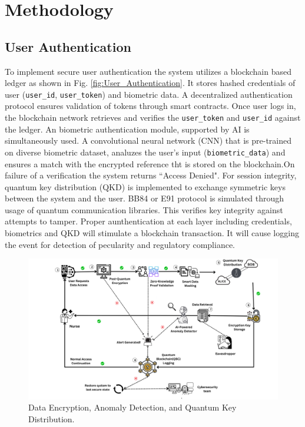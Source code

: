 \documentclass[pdflatex,sn-mathphys-num]{sn-jnl}%
\theoremstyle{thmstyleone}%
\theoremstyle{thmstyletwo}%
\theoremstyle{thmstylethree}%
\begin{document}

\section{Methodology}




\subsection{User Authentication}
To implement secure user authentication the system utilizes a blockchain based ledger as shown in Fig. \ref{fig:User_Authentication}. It stores hashed credentials of user (\texttt{user\_id}, \texttt{user\_token}) and biometric data\cite{bib14}. A decentralized authentication protocol ensures validation of tokens through smart contracts. Once user logs in, the blockchain network retrieves and verifies the \texttt{user\_token} and \texttt{user\_id} against the ledger. An biometric authentication module, supported by AI is simultaneously used. A convolutional neural network (CNN) that is pre-trained on diverse biometric dataset, analuzes the user’s input (\texttt{biometric\_data}) and ensures a match with the encrypted reference tht is stored on the blockchain.On failure of a verification the system returns ``Access Denied". For session integrity, quantum key distribution (QKD) is implemented to exchange symmetric keys between the system and the user\cite{}. BB84 or E91 protocol is simulated through usage of quantum communication libraries\cite{bib16}. This verifies key integrity against attempts to tamper. Proper aunthentication at each layer including credentials, biometrics and QKD will stimulate a blockchain transaction. It will cause logging the event for detection of pecularity and regulatory compliance.



\begin{figure}[t]
\centering
\includegraphics[width=13cm]{QKD.png}
\centering
\caption{Data Encryption, Anomaly Detection, and Quantum Key Distribution.}
  \label{fig:Data access}
\end{figure}
\end{document}
